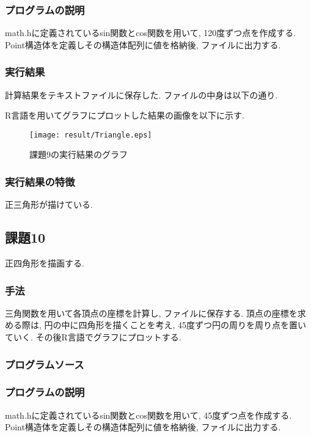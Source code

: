 \documentclass{jsarticle}
\begin{document}
            \subsubsection{プログラムの説明}
                math.hに定義されているsin関数とcos関数を用いて, 120度ずつ点を作成する. 
                Point構造体を定義しその構造体配列に値を格納後, ファイルに出力する. 
            \subsubsection{実行結果}
                計算結果をテキストファイルに保存した. ファイルの中身は以下の通り. 
                
                R言語を用いてグラフにプロットした結果の画像を以下に示す. 
                \begin{figure}[H]
                    \centering
                    \texttt{[image: result/Triangle.eps]}
                    \caption{課題9の実行結果のグラフ}
                \end{figure}
            \subsubsection{実行結果の特徴}
                正三角形が描けている. 

        \subsection{課題10}
            正四角形を描画する. 
            \subsubsection{手法}
                三角関数を用いて各頂点の座標を計算し, ファイルに保存する. 
                頂点の座標を求める際は, 円の中に四角形を描くことを考え, 45度ずつ円の周りを周り点を置いていく. 
                その後R言語でグラフにプロットする. 
            \subsubsection{プログラムソース}
                

            \subsubsection{プログラムの説明}
                math.hに定義されているsin関数とcos関数を用いて, 45度ずつ点を作成する. 
                Point構造体を定義しその構造体配列に値を格納後, ファイルに出力する. 
\end{document}
